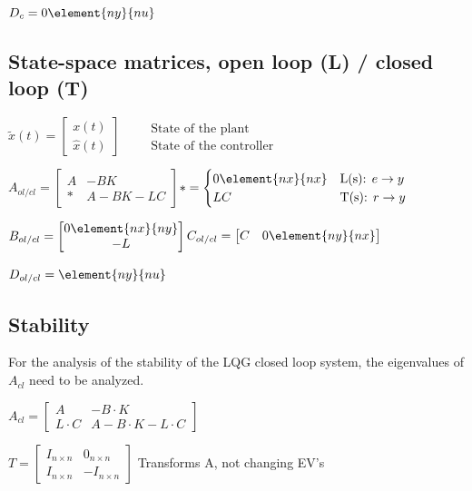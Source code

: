 \documentclass[10pt,a4paper]{scrartcl}
\begin{document}
\begin{multicols*}{3}
	$D_c=0\element{ny}{nu}$
	
	\subsection*{State-space matrices, open loop (L) / closed loop (T)}
	
	$\tilde{x}(t)=\begin{bmatrix}x(t)\\ \hat{x}(t)\end{bmatrix} \qquad\begin{matrix}\text{State of the plant}\\ \text{State of the controller}\end{matrix}$
	
	\small
	$A_{ol/cl}=\begin{bmatrix}A&-BK\\ \ast&A-BK-LC\end{bmatrix}$\hfill$\ast=\begin{cases}0\element{nx}{nx}&\text{L(s): } e\rightarrow y\\LC&\text{T(s): }r\rightarrow y\end{cases}$
	
	$B_{ol/cl}=\begin{bmatrix}0\element{nx}{ny}\\-L\end{bmatrix}$\hfill$C_{ol/cl}=\begin{bmatrix}C&0\element{ny}{nx}\end{bmatrix}$
	
	$D_{ol/cl}=\element{ny}{nu}$	
	\normalsize
	
	\subsection*{Stability}
	
	For the analysis of the stability of the LQG closed loop system, the eigenvalues of $A_{cl}$ need to be analyzed.
	
	$A_{cl}=\begin{bmatrix}A&-B\cdot K\\L\cdot C&A-B\cdot K -L\cdot C\end{bmatrix}$
	
	$T=\begin{bmatrix}I_{n\times n}&0_{n\times n}\\I_{n\times n}&-I_{n\times n}\end{bmatrix}$ Transforms A, not changing EV's
	

\end{multicols*}
\end{document}
